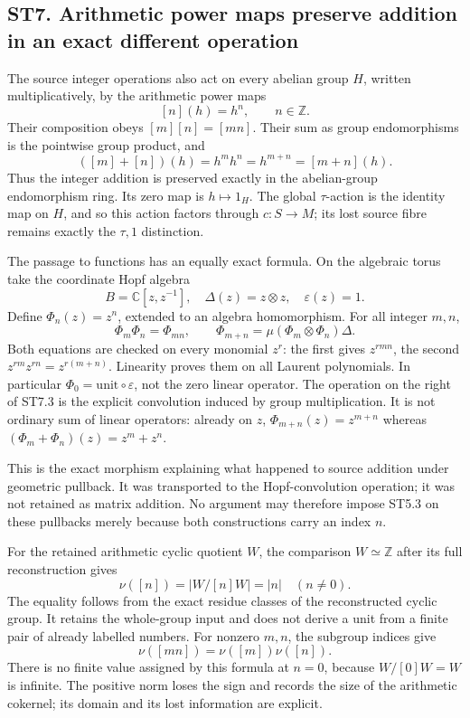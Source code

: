 \subsection{ST7. Arithmetic power maps preserve addition in an exact
different
operation}\label{st7.-arithmetic-power-maps-preserve-addition-in-an-exact-different-operation}

The source integer operations also act on every abelian group \(H\),
written multiplicatively, by the arithmetic power maps \[
 [n](h)=h^n,\qquad n\in\mathbb Z.
\tag{ST7.1}
\] Their composition obeys \([m][n]=[mn]\). Their sum as group
endomorphisms is the pointwise group product, and \[
 ([m]+[n])(h)=h^mh^n=h^{m+n}=[m+n](h).
\tag{ST7.2}
\] Thus the integer addition is preserved exactly in the abelian-group
endomorphism ring. Its zero map is \(h\mapsto1_H\). The global
\(\tau\)-action is the identity map on \(H\), and so this action factors
through \(c:S\to M\); its lost source fibre remains exactly the
\(\tau,1\) distinction.

The passage to functions has an equally exact formula. On the algebraic
torus take the coordinate Hopf algebra \[
 B=\mathbb C[z,z^{-1}],\quad
 \Delta(z)=z\otimes z,\quad \varepsilon(z)=1.
\] Define \(\Phi_n(z)=z^n\), extended to an algebra homomorphism. For
all integer \(m,n\), \[
 \Phi_m\Phi_n=\Phi_{mn},\qquad
 \boxed{\Phi_{m+n}=\mu(\Phi_m\otimes\Phi_n)\Delta.}
\tag{ST7.3}
\] Both equations are checked on every monomial \(z^r\): the first gives
\(z^{rmn}\), the second \(z^{rm}z^{rn}=z^{r(m+n)}\). Linearity proves
them on all Laurent polynomials. In particular
\(\Phi_0=\mathrm{unit}\circ\varepsilon\), not the zero linear operator.
The operation on the right of ST7.3 is the explicit convolution induced
by group multiplication. It is not ordinary sum of linear operators:
already on \(z\), \(\Phi_{m+n}(z)=z^{m+n}\) whereas
\((\Phi_m+\Phi_n)(z)=z^m+z^n\).

This is the exact morphism explaining what happened to source addition
under geometric pullback. It was transported to the Hopf-convolution
operation; it was not retained as matrix addition. No argument may
therefore impose ST5.3 on these pullbacks merely because both
constructions carry an index \(n\).

For the retained arithmetic cyclic quotient \(W\), the comparison
\(W\simeq\mathbb Z\) after its full reconstruction gives \[
 \nu([n])=|W/[n]W|=|n|\quad(n\ne0).
\tag{ST7.4}
\] The equality follows from the exact residue classes of the
reconstructed cyclic group. It retains the whole-group input and does
not derive a unit from a finite pair of already labelled numbers. For
nonzero \(m,n\), the subgroup indices give \[
 \nu([mn])=\nu([m])\nu([n]).
\tag{ST7.5}
\] There is no finite value assigned by this formula at \(n=0\), because
\(W/[0]W=W\) is infinite. The positive norm loses the sign and records
the size of the arithmetic cokernel; its domain and its lost information
are explicit.

